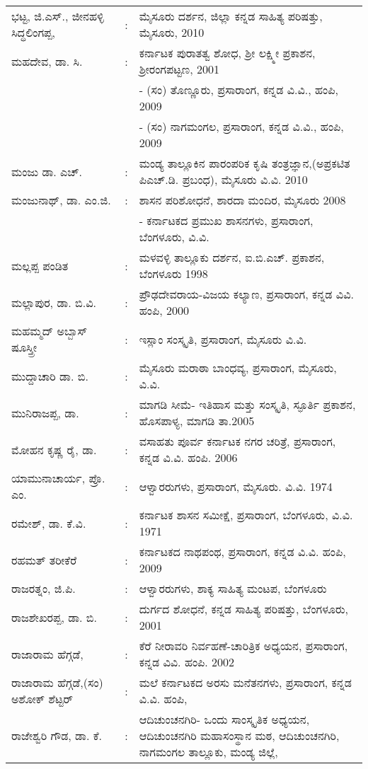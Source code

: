 \begin{longtable}[l]{@{}>{\raggedright}p{4.7cm}cp{9.2cm}<{\raggedright}@{}}
ಭಟ್ಟ, ಜಿ.ಎಸ್​., ಜೀನಹಳ್ಳಿ ಸಿದ್ಧಲಿಂಗಪ್ಪ, & : & ಮೈಸೂರು ದರ್ಶನ, ಜಿಲ್ಲಾ ಕನ್ನಡ ಸಾಹಿತ್ಯ ಪರಿಷತ್ತು, ಮೈಸೂರು, 2010\\
ಮಹದೇವ, ಡಾ. ಸಿ. & : &  ಕರ್ನಾಟಕ ಪುರಾತತ್ವ ಶೋಧ, ಶ‍್ರೀ ಲಕ್ಷ್ಮೀ ಪ್ರಕಾಶನ, ಶ‍್ರೀರಂಗಪಟ್ಟಣ, 2001\\
&& - (ಸಂ) ತೊಣ್ಣೂರು, ಪ್ರಸಾರಾಂಗ, ಕನ್ನಡ ವಿ.ವಿ., ಹಂಪಿ, 2009\\
&& - (ಸಂ) ನಾಗಮಂಗಲ, ಪ್ರಸಾರಾಂಗ, ಕನ್ನಡ ವಿ.ವಿ., ಹಂಪಿ, 2009\\
ಮಂಜು ಡಾ. ಎಚ್​. & : & ಮಂಡ್ಯ ತಾಲ್ಲೂಕಿನ ಪಾರಂಪರಿಕ ಕೃಷಿ ತಂತ್ರಜ್ಞಾನ,(ಅಪ್ರಕಟಿತ ಪಿಎಚ್​.ಡಿ. ಪ್ರಬಂಧ), ಮೈಸೂರು ವಿ.ವಿ. 2010\\
ಮಂಜುನಾಥ್​, ಡಾ. ಎಂ.ಜಿ. & : &  ಶಾಸನ ಪರಿಶೋಧನೆ, ಶಾರದಾ ಮಂದಿರ, ಮೈಸೂರು 2008\\
&& - ಕರ್ನಾಟಕದ ಪ್ರಮುಖ ಶಾಸನಗಳು, ಪ್ರಸಾರಾಂಗ, ಬೆಂಗಳೂರು, ವಿ.ವಿ.\\
ಮಲ್ಲಪ್ಪ ಪಂಡಿತ & : &  ಮಳವಳ್ಳಿ ತಾಲ್ಲೂಕು ದರ್ಶನ, ಐ.ಬಿ.ಎಚ್​. ಪ್ರಕಾಶನ, ಬೆಂಗಳೂರು 1998\\
ಮಲ್ಲಾಪುರ, ಡಾ. ಬಿ.ವಿ. & : & ಪ್ರೌಢದೇವರಾಯ-ವಿಜಯ ಕಲ್ಯಾಣ, ಪ್ರಸಾರಾಂಗ, ಕನ್ನಡ ವಿವಿ. ಹಂಪಿ, 2000\\
ಮಹಮ್ಮದ್​ ಅಬ್ಬಾಸ್​ ಷೂಸ್ತ್ರೀ & : & ಇಸ್ಲಾಂ ಸಂಸ್ಕೃತಿ, ಪ್ರಸಾರಾಂಗ, ಮೈಸೂರು ವಿ.ವಿ.\\
ಮುದ್ದಾಚಾರಿ ಡಾ. ಬಿ. & : & ಮೈಸೂರು ಮರಾಠಾ ಬಾಂಧವ್ಯ, ಪ್ರಸಾರಾಂಗ, ಮೈಸೂರು, ವಿ.ವಿ. \\
ಮುನಿರಾಜಪ್ಪ, ಡಾ. & : &  ಮಾಗಡಿ ಸೀಮೆ- ಇತಿಹಾಸ ಮತ್ತು ಸಂಸ್ಕೃತಿ, ಸ್ಫೂರ್ತಿ ಪ್ರಕಾಶನ, ಹೊಸಪಾಳ್ಯ, ಮಾಗಡಿ ತಾ.2005\\
ಮೋಹನ ಕೃಷ್ಣ ರೈ, ಡಾ. & : &  ವಸಾಹತು ಪೂರ್ವ ಕರ್ನಾಟಕ ನಗರ ಚರಿತ್ರೆ, ಪ್ರಸಾರಾಂಗ, ಕನ್ನಡ ವಿ.ವಿ. ಹಂಪಿ. 2006\\
ಯಾಮುನಾಚಾರ್ಯ, ಪ್ರೊ. ಎಂ. & : & ಆಳ್ವಾರರುಗಳು, ಪ್ರಸಾರಾಂಗ, ಮೈಸೂರು. ವಿ.ವಿ. 1974\\
ರಮೇಶ್​, ಡಾ. ಕೆ.ವಿ. & : &  ಕರ್ನಾಟಕ ಶಾಸನ ಸಮೀಕ್ಷೆ, ಪ್ರಸಾರಾಂಗ, ಬೆಂಗಳೂರು, ವಿ.ವಿ. 1971\\
ರಹಮತ್​ ತರೀಕೆರೆ & : & ಕರ್ನಾಟಕದ ನಾಥಪಂಥ, ಪ್ರಸಾರಾಂಗ, ಕನ್ನಡ ವಿ.ವಿ. ಹಂಪಿ, 2009\\
ರಾಜರತ್ನಂ, ಜಿ.ಪಿ. & : & ಆಳ್ವಾರರುಗಳು, ಶಾಕ್ಯ ಸಾಹಿತ್ಯ ಮಂಟಪ, ಬೆಂಗಳೂರು\\
ರಾಜಶೇಖರಪ್ಪ, ಡಾ. ಬಿ. & : &  ದುರ್ಗದ ಶೋಧನೆ, ಕನ್ನಡ ಸಾಹಿತ್ಯ ಪರಿಷತ್ತು, ಬೆಂಗಳೂರು, 2001\\
ರಾಜಾರಾಮ ಹೆಗ್ಗಡೆ, & : &  ಕೆರೆ ನೀರಾವರಿ ನಿರ್ವಹಣೆ-ಚಾರಿತ್ರಿಕ ಅಧ್ಯಯನ, ಪ್ರಸಾರಾಂಗ, ಕನ್ನಡ ವಿವಿ. ಹಂಪಿ. 2002\\
ರಾಜಾರಾಮ ಹೆಗ್ಗಡೆ,(ಸಂ) ಅಶೋಕ್​ ಶೆಟ್ಟರ್​ & : &  ಮಲೆ ಕರ್ನಾಟಕದ ಅರಸು ಮನೆತನಗಳು, ಪ್ರಸಾರಾಂಗ, ಕನ್ನಡ ವಿ.ವಿ. ಹಂಪಿ,\\
ರಾಜೇಶ್ವರಿ ಗೌಡ, ಡಾ. ಕೆ. & : &  ಆದಿಚುಂಚನಗಿರಿ- ಒಂದು ಸಾಂಸ್ಕೃತಿಕ ಅಧ್ಯಯನ, ಆದಿಚುಂಚನಗಿರಿ ಮಹಾಸಂಸ್ಥಾನ ಮಠ, ಆದಿಚುಂಚನಗಿರಿ, ನಾಗಮಂಗಲ ತಾಲ್ಲೂಕು, ಮಂಡ್ಯ ಜಿಲ್ಲೆ,\\

\end{longtable}
